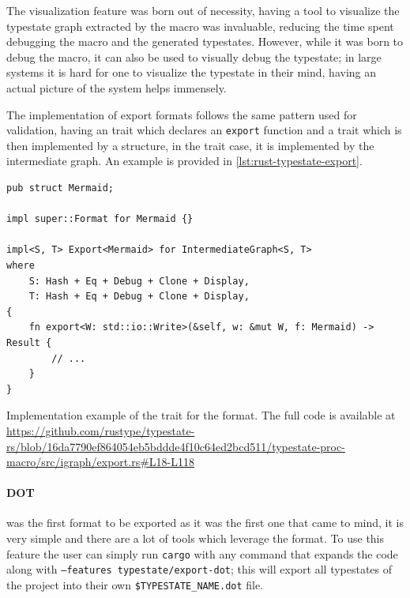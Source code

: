 The visualization feature was born out of necessity,
having a tool to visualize the typestate graph extracted by the macro was invaluable,
reducing the time spent debugging the macro and the generated typestates.
However, while it was born to debug the macro, it can also be used to visually debug the typestate;
in large systems it is hard for one to visualize the typestate in their mind,
having an actual picture of the system helps immensely.

The implementation of export formats follows the same pattern used for validation,
having an  trait which declares an \texttt{export} function and a  trait which is then implemented by a structure,
in the  trait case, it is implemented by the intermediate graph.
An example is provided in \autoref{lst:rust-typestate-export}.

\begin{listing}
    \begin{verbatim}
pub struct Mermaid;

impl super::Format for Mermaid {}

impl<S, T> Export<Mermaid> for IntermediateGraph<S, T>
where
    S: Hash + Eq + Debug + Clone + Display,
    T: Hash + Eq + Debug + Clone + Display,
{
    fn export<W: std::io::Write>(&self, w: &mut W, f: Mermaid) -> Result {
        // ...
    }
}
    \end{verbatim}
    \caption{Implementation example of the  trait for the  format. The full code is available at \url{https://github.com/rustype/typestate-rs/blob/16da7790ef864054eb5bddde4f10c64ed2bcd511/typestate-proc-macro/src/igraph/export.rs\#L18-L118}}
    \label{lst:rust-typestate-export}
\end{listing}

\paragraph{DOT} was the first format to be exported as it was the first one that came to mind,
it is very simple and there are a lot of tools which leverage the format.
To use this feature the user can simply run \texttt{cargo} with any command that expands the code along with \texttt{--features typestate/export-dot};
this will export all typestates of the project into their own \texttt{\$TYPESTATE\_NAME.dot} file.


